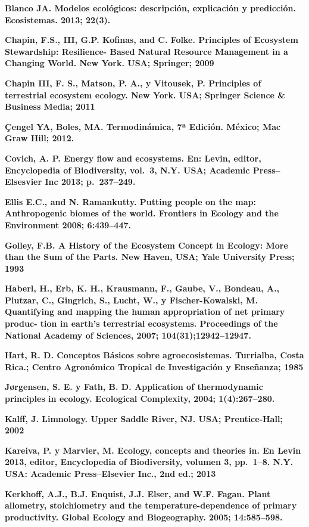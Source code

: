 \documentclass[
]{article}
\begin{document}
\textbf{Blanco JA. Modelos ecológicos: descripción, explicación y
predicción. Ecosistemas. 2013; 22(3).}

\textbf{Chapin, F.S., III, G.P. Kofinas, and C. Folke. Principles of
Ecosystem Stewardship: Resilience- Based Natural Resource Management in
a Changing World. New York. USA; Springer; 2009}

\textbf{Chapin III, F. S., Matson, P. A., y Vitousek, P. Principles of
terrestrial ecosystem ecology. New York. USA; Springer Science \&
Business Media; 2011}

\textbf{Çengel YA, Boles, MA. Termodinámica, 7ª Edición. México; Mac
Graw Hill; 2012.}

\textbf{Covich, A. P. Energy flow and ecosystems. En: Levin, editor,
Encyclopedia of Biodiversity, vol.~3, N.Y. USA; Academic
Press--Elsesvier Inc 2013; p.~237--249.}

\textbf{Ellis E.C., and N. Ramankutty. Putting people on the map:
Anthropogenic biomes of the world. Frontiers in Ecology and the
Environment 2008; 6:439--447.}

\textbf{Golley, F.B. A History of the Ecosystem Concept in Ecology: More
than the Sum of the Parts. New Haven, USA; Yale University Press; 1993}

\textbf{Haberl, H., Erb, K. H., Krausmann, F., Gaube, V., Bondeau, A.,
Plutzar, C., Gingrich, S., Lucht, W., y Fischer-Kowalski, M. Quantifying
and mapping the human appropriation of net primary produc- tion in
earth's terrestrial ecosystems. Proceedings of the National Academy of
Sciences, 2007; 104(31);12942--12947.}

\textbf{Hart, R. D. Conceptos Básicos sobre agroecosistemas. Turrialba,
Costa Rica.; Centro Agronómico Tropical de Investigación y Enseñanza;
1985}

\textbf{Jørgensen, S. E. y Fath, B. D. Application of thermodynamic
principles in ecology. Ecological Complexity, 2004; 1(4):267--280.}

\textbf{Kalff, J. Limnology. Upper Saddle River, NJ. USA; Prentice-Hall;
2002}

\textbf{Kareiva, P. y Marvier, M. Ecology, concepts and theories in. En
Levin 2013, editor, Encyclopedia of Biodiversity, volumen 3, pp.~1--8.
N.Y. USA: Academic Press--Elsevier Inc., 2nd ed.; 2013}

\textbf{Kerkhoff, A.J., B.J. Enquist, J.J. Elser, and W.F. Fagan. Plant
allometry, stoichiometry and the temperature-dependence of primary
productivity. Global Ecology and Biogeography. 2005; 14:585--598.}
\end{document}
